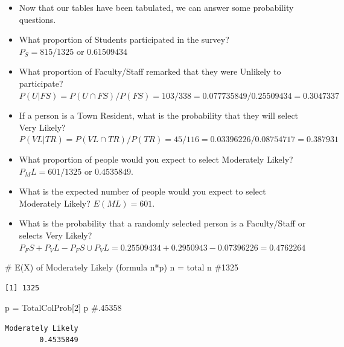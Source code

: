 \documentclass[
  letterpaper,
  DIV=11,
  numbers=noendperiod]{scrreprt}
\newenvironment{Shaded}{\begin{snugshade}}{\end{snugshade}}
\newcommand{\CommentTok}[1]{\textcolor[rgb]{0.37,0.37,0.37}{#1}}
\newcommand{\DecValTok}[1]{\textcolor[rgb]{0.68,0.00,0.00}{#1}}
\newcommand{\NormalTok}[1]{\textcolor[rgb]{0.00,0.23,0.31}{#1}}
\newcommand{\OtherTok}[1]{\textcolor[rgb]{0.00,0.23,0.31}{#1}}
\begin{document}
\begin{itemize}
\item
  Now that our tables have been tabulated, we can answer some
  probability questions.
\item
  What proportion of Students participated in the survey?\\
  \(P_S= 815/1325\) or \(0.61509434\)
\item
  What proportion of Faculty/Staff remarked that they were Unlikely to
  participate?\\
  \(P(U|FS) = P(U \cap FS) / P(FS) = 103/338 = 0.077735849/0.25509434 = 0.3047337\)
\item
  If a person is a Town Resident, what is the probability that they will
  select Very Likely?\\
  \(P(VL|TR) = P(VL \cap TR) / P(TR) = 45/116 = 0.03396226/0.08754717 = 0.387931\)
\item
  What proportion of people would you expect to select Moderately
  Likely?\\
  \(P_ML = 601/1325\) or \(0.4535849\).
\item
  What is the expected number of people would you expect to select
  Moderately Likely? \(E(ML) = 601\).
\item
  What is the probability that a randomly selected person is a
  Faculty/Staff or selects Very Likely?\\
  \(P_FS + P_VL - P_FS \cup P_VL = 0.25509434 + 0.2950943 − 0.07396226 = 0.4762264\)
\end{itemize}

\begin{Shaded}
\begin{Highlighting}[]
\CommentTok{\# E(X) of Moderately Likely (formula n*p)}
\NormalTok{n }\OtherTok{=}\NormalTok{ total}
\NormalTok{n  }\CommentTok{\#1325}
\end{Highlighting}
\end{Shaded}

\begin{verbatim}
[1] 1325
\end{verbatim}

\begin{Shaded}
\begin{Highlighting}[]
\NormalTok{p }\OtherTok{=}\NormalTok{ TotalColProb[}\DecValTok{2}\NormalTok{]}
\NormalTok{p  }\CommentTok{\#.45358}
\end{Highlighting}
\end{Shaded}

\begin{verbatim}
Moderately Likely 
        0.4535849 
\end{verbatim}
\end{document}
